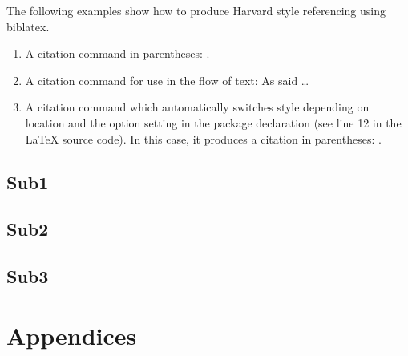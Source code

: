 \documentclass[a4paper, 12pt]{article}
\begin{document}
The following examples show how to produce Harvard style referencing using biblatex.

\begin{enumerate}
\item A citation command in parentheses: \parencite{Smith:2012qr}.
\item A citation command for use in the flow of text: As \textcite{Smith:2013jd} said \dots
\item A citation command which automatically switches style depending on location and the option setting in the package declaration (see line 12 in the LaTeX source code). In this case, it produces a citation in parentheses: \autocite{Other:2014ab}.
\end{enumerate}


\subsection{Sub1}


\subsection{Sub2}


\subsection{Sub3}



\pagebreak


\section{Appendices}


\pagebreak





\printbibliography
\pagebreak


\end{document}

